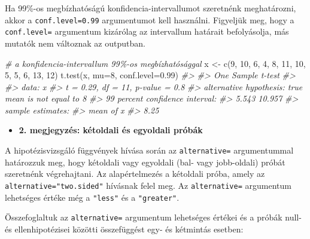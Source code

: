 \documentclass[
]{book}
\newenvironment{Shaded}{\begin{snugshade}}{\end{snugshade}}
\newcommand{\AttributeTok}[1]{\textcolor[rgb]{0.77,0.63,0.00}{#1}}
\newcommand{\CommentTok}[1]{\textcolor[rgb]{0.56,0.35,0.01}{\textit{#1}}}
\newcommand{\DecValTok}[1]{\textcolor[rgb]{0.00,0.00,0.81}{#1}}
\newcommand{\FloatTok}[1]{\textcolor[rgb]{0.00,0.00,0.81}{#1}}
\newcommand{\FunctionTok}[1]{\textcolor[rgb]{0.00,0.00,0.00}{#1}}
\newcommand{\NormalTok}[1]{#1}
\newcommand{\OtherTok}[1]{\textcolor[rgb]{0.56,0.35,0.01}{#1}}
\providecommand{\tightlist}{%
  \setlength{\itemsep}{0pt}\setlength{\parskip}{0pt}}
\begin{document}
Ha 99\%-os megbízhatóságú konfidencia-intervallumot szeretnénk meghatározni, akkor a \texttt{conf.level=0.99} argumentumot kell használni. Figyeljük meg, hogy a \texttt{conf.level=} argumentum kizárólag az intervallum határait befolyásolja, más mutatók nem változnak az outputban.

\begin{Shaded}
\begin{Highlighting}[]
\CommentTok{\# a konfidencia{-}intervallum 99\%{-}os megbízhatósággal}
\NormalTok{x }\OtherTok{\textless{}{-}} \FunctionTok{c}\NormalTok{(}\DecValTok{9}\NormalTok{, }\DecValTok{10}\NormalTok{, }\DecValTok{6}\NormalTok{, }\DecValTok{4}\NormalTok{, }\DecValTok{8}\NormalTok{, }\DecValTok{11}\NormalTok{, }\DecValTok{10}\NormalTok{, }\DecValTok{5}\NormalTok{, }\DecValTok{5}\NormalTok{, }\DecValTok{6}\NormalTok{, }\DecValTok{13}\NormalTok{, }\DecValTok{12}\NormalTok{)}
\FunctionTok{t.test}\NormalTok{(x, }\AttributeTok{mu=}\DecValTok{8}\NormalTok{, }\AttributeTok{conf.level=}\FloatTok{0.99}\NormalTok{)  }
\CommentTok{\#\textgreater{} }
\CommentTok{\#\textgreater{}  One Sample t{-}test}
\CommentTok{\#\textgreater{} }
\CommentTok{\#\textgreater{} data:  x}
\CommentTok{\#\textgreater{} t = 0.29, df = 11, p{-}value = 0.8}
\CommentTok{\#\textgreater{} alternative hypothesis: true mean is not equal to 8}
\CommentTok{\#\textgreater{} 99 percent confidence interval:}
\CommentTok{\#\textgreater{}   5.543 10.957}
\CommentTok{\#\textgreater{} sample estimates:}
\CommentTok{\#\textgreater{} mean of x }
\CommentTok{\#\textgreater{}      8.25}
\end{Highlighting}
\end{Shaded}

\begin{itemize}
\tightlist
\item
  \textbf{2. megjegyzés: kétoldali és egyoldali próbák}
\end{itemize}

A hipotézisvizsgáló függvények hívása során az \texttt{alternative=} argumentummal határozzuk meg, hogy kétoldali vagy egyoldali (bal- vagy jobb-oldali) próbát szeretnénk végrehajtani. Az alapértelmezés a kétoldali próba, amely az \texttt{alternative="two.sided"} hívásnak felel meg. Az \texttt{alternative=} argumentum lehetséges értéke még a \texttt{"less"} és a \texttt{"greater"}.

Összefoglaltuk az \texttt{alternative=} argumentum lehetséges értékei és a próbák null- és ellenhipotézisei közötti összefüggést egy- és kétmintás esetben:
\end{document}
